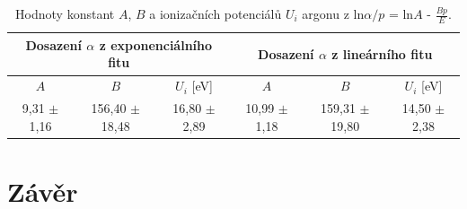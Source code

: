 \documentclass[a4paper,12pt]{article}
\begin{document}
\begin{center}
	\begin{table}[h]
		\centering
		\caption{Hodnoty konstant $A$, $B$ a ionizačních potenciálů $U_i$ argonu z ln$\alpha/p$ = ln$A$ - $\frac{Bp}{E}$.}
		\label{tab2}
		\begin{tabular}{|c|c|c|c|c|c|} \hline
			\multicolumn{3}{|c|}{Dosazení $\alpha$ z exponenciálního fitu} & \multicolumn{3}{c|}{Dosazení $\alpha$ z lineárního fitu}  \\ \hline
			$A$ & $B$ & $U_i$ [eV] & $A$ & $B$ & $U_i$ [eV] \\ \hline
			9,31 $\pm$ 1,16 & 156,40 $\pm$ 18,48 &  16,80 $\pm$ 2,89  & 10,99 $\pm$ 1,18 & 159,31 $\pm$ 19,80 & 14,50 $\pm$ 2,38\\ \hline

			
		\end{tabular}
	\end{table}
\end{center}

\newpage
\section{Závěr}
\end{document}
